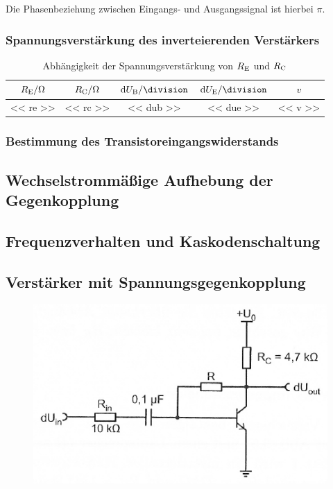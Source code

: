 Die Phasenbeziehung zwischen Eingangs- und Ausgangssignal ist hierbei $\pi$.

\subsubsection{Spannungsverstärkung des inverteierenden Verstärkers}

\begin{table}
	\centering
	\begin{tabular}{SSSSS}
		{$\RE / \si\ohm$} &
		{$\RC / \si\ohm$} &
		{$\dif\UB / \si\division$} &
		{$\dif\UE / \si\division$} &
		{$v$} \\
		\hline
		<< re >> & << rc >> & << dub >> & << due >> & << v >> \\
	\end{tabular}
	\caption{%
		Abhängigkeit der Spannungsverstärkung von $\RE$ und $\RC$
	}
	\label{tab:412}
\end{table}

\fehlt

\subsubsection{Bestimmung des Transistoreingangswiderstands}

\fehlt

\subsection{Wechselstrommäßige Aufhebung der Gegenkopplung}

\fehlt

\subsection{Frequenzverhalten und Kaskodenschaltung}

\fehlt

\subsection{Verstärker mit Spannungsgegenkopplung}

\fehlt

\begin{figure}[htbp]
	\centering
	\includegraphics[width=.6\textwidth]{Anleitung/4-1.png}
	\caption{
		\cite[Abbildung~4.1]{physik313-Anleitung}
	}
	\label{fig:4-1}
\end{figure}

